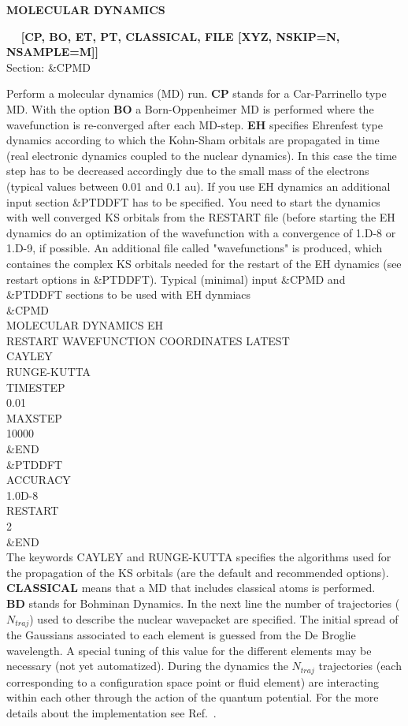 \documentclass[twoside,10pt,titlepage,a4paper]{article}
\newcommand{\reflabel}[1]{\hypertarget{#1}}
\newcommand{\reflabel}[1]{\label{#1}}
\newcommand{\keyword}[5]{%
\vspace{1.0cm}
\begin{minipage}{15cm}
\reflabel{#1}{\textbf{\large #1}}%
\index{#1}%
\ \textbf{#2}%
\ \textbf{#3}%
\ \textit{#4}%
     \hfill\\\smallskip
     {Section: #5}
     \hfill\\\smallskip\vskip 10pt
\end{minipage}
}%
\newcommand{\desc}[1]{%
   \hspace*{\fill} \parbox{130mm}{\sloppy
                          {#1}%
                             }
     \hfill\\\smallskip
   }%
\newcommand{\desc}[1]{#1\vspace{1ex}}
\begin{document}
\keyword{MOLECULAR DYNAMICS}{}{[CP, BO, ET, PT, CLASSICAL, FILE [XYZ, NSKIP=N, NSAMPLE=M]]}{}{\&CPMD}
  \desc{Perform a molecular dynamics (MD) run.
      {\bf CP} stands for a Car-Parrinello type MD.
      With the option {\bf BO} a Born-Oppenheimer MD is performed
      where the wavefunction is re-converged after each MD-step. 
      {\bf EH} specifies Ehrenfest type dynamics according to which the Kohn-Sham
      orbitals are propagated in time (real electronic dynamics coupled to the nuclear dynamics). 
      In this case the time step has to be decreased accordingly due to the small mass of the
      electrons (typical values between 0.01 and 0.1 au). If you use EH dynamics an additional input
      section {\&PTDDFT} has to be specified. You need to start the dynamics with well converged
      KS orbitals from the RESTART file (before starting the EH dynamics do an optimization of the
      wavefunction with a convergence of {1.D-8} or {1.D-9}, if possible. An additional file
      called "wavefunctions" is produced, which containes the complex KS orbitals needed for
      the restart of the EH dynamics (see restart options in {\&PTDDFT}). Typical (minimal) input
      \&CPMD and \&PTDDFT sections to be used with EH dynmiacs\\
      \&CPMD \\
        MOLECULAR DYNAMICS EH \\
        RESTART WAVEFUNCTION COORDINATES LATEST \\
        CAYLEY \\
        RUNGE-KUTTA \\
        TIMESTEP \\ 
        0.01 \\
        MAXSTEP \\ 
        10000 \\
     \&END \\
     \&PTDDFT \\
       ACCURACY \\ 
       1.0D-8 \\ 
       RESTART \\ 
       2 \\
     \&END \\
      The keywords CAYLEY and RUNGE-KUTTA specifies the algorithms used for the propagation of the KS
      orbitals (are the default and recommended options).\\
      {\bf CLASSICAL }
      means that a MD that includes classical atoms is performed.\\
      {\bf BD} stands for Bohminan Dynamics. In the next line the number of trajectories
      ($N_{traj}$) used to describe the nuclear wavepacket are specified.
      The initial spread of the Gaussians associated to each element is guessed from the De Broglie wavelength.
      A special tuning of this value for the different elements may be necessary (not yet automatized).
      During the dynamics the $N_{traj}$ trajectories (each corresponding to a configuration space point or
      fluid element) are interacting within each other through the action of the quantum potential.
      For the more details about the implementation see Ref.~\cite{ABDY}.

}
\end{document}
